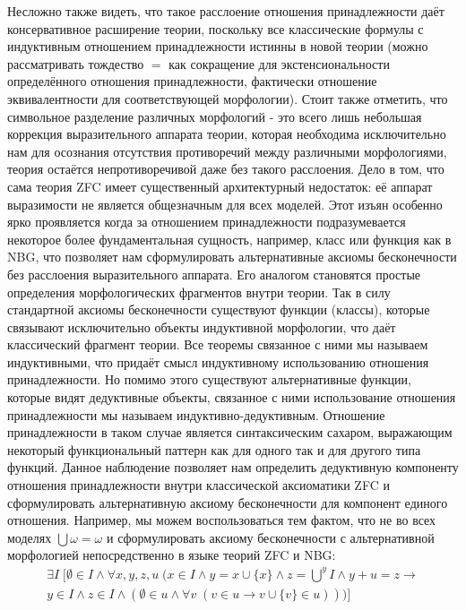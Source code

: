 \documentclass[12pt]{article}
\begin{document}
Несложно также видеть, что такое расслоение отношения принадлежности даёт консервативное расширение теории, поскольку все классические формулы с индуктивным отношением принадлежности истинны в новой теории (можно рассматривать тождество $=$ как сокращение для экстенсиональности определённого отношения принадлежности, фактически отношение эквивалентности для соответствующей морфологии). Стоит также отметить, что символьное разделение различных морфологий - это всего лишь небольшая коррекция выразительного аппарата теории, которая необходима исключительно нам для осознания отсутствия противоречий между различными морфологиями, теория остаётся непротиворечивой даже без такого расслоения. Дело в том, что сама теория ZFC имеет существенный архитектурный недостаток: её аппарат выразимости не является общезначным для всех моделей. Этот изъян особенно ярко проявляется когда за отношением принадлежности подразумевается некоторое более фундаментальная сущность, например, класс или функция как в NBG, что позволяет нам сформулировать альтернативные аксиомы бесконечности без расслоения выразительного аппарата. Его аналогом становятся простые определения морфологических фрагментов внутри теории. Так в силу стандартной аксиомы бесконечности существуют функции (классы), которые связывают исключительно объекты индуктивной морфологии, что даёт классический фрагмент теории. Все теоремы связанное с ними мы называем индуктивными, что придаёт смысл индуктивному использованию отношения принадлежности. Но помимо этого существуют альтернативные функции, которые видят дедуктивные объекты, связанное с ними использование отношения принадлежности мы называем индуктивно-дедуктивным. Отношение принадлежности в таком случае является синтаксическим сахаром, выражающим некоторый функциональный паттерн как для одного так и для другого типа функций. Данное наблюдение позволяет нам определить дедуктивную компоненту отношения принадлежности внутри классической аксиоматики ZFC и сформулировать альтернативную аксиому бесконечности для компонент единого отношения. Например, мы можем воспользоваться тем фактом, что не во всех моделях $\bigcup \omega = \omega$ и сформулировать аксиому бесконечности с альтернативной морфологией непосредственно в языке теорий ZFC и NBG:
\begin{equation}
\begin{gathered}
\exists I \; \bigl[\emptyset \in I \wedge \forall x, y, z, u \; \bigl( x \in I \wedge y = x \cup \{ x \} \wedge z = \bigcup\nolimits^y I \wedge y + u = z \to\\ 
y \in I \wedge z \in I \wedge (\emptyset \in u \wedge \forall v \; (v \in u \to v \cup \{ v \} \in u)) \bigr)\bigr]
\label{axiom:indexal-infinity-no-delamination}
\end{gathered}
\end{equation}
\end{document}
